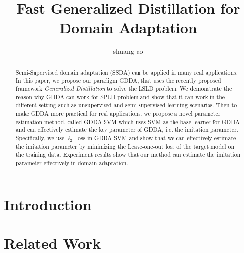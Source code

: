 \documentclass[11pt,onecolumn]{article}
\author{shuang ao\\
}
\title{
\large\textbf{Fast Generalized Distillation for Domain Adaptation}
}
\begin{document}
\maketitle
\begin{abstract}
Semi-Supervised domain adaptation (SSDA) can be applied in many real applications. In this paper, we propose our paradigm GDDA, that uses the recently proposed framework \textit{Generalized Distillation} \cite{lopez2015unifying} to solve the LSLD problem.
We demonstrate the reason why GDDA can work for SPLD problem and show that it can work in the different setting such as unsupervised and semi-supervised learning scenarios. Then to make GDDA more practical for real applications, we propose a novel parameter estimation method, called GDDA-SVM which uses SVM as the base learner for GDDA and can effectively estimate the key parameter of GDDA, i.e. the imitation parameter. Specifically, we use $\ell_2$-loss in GDDA-SVM and show that we can effectively estimate the imitation parameter by minimizing the Leave-one-out loss of the target model on the training data. Experiment results show that our method can estimate the imitation parameter effectively in domain adaptation.

\end{abstract}
\section{Introduction}


%

%

\section{Related Work}\label{sec:work}

\end{document}
